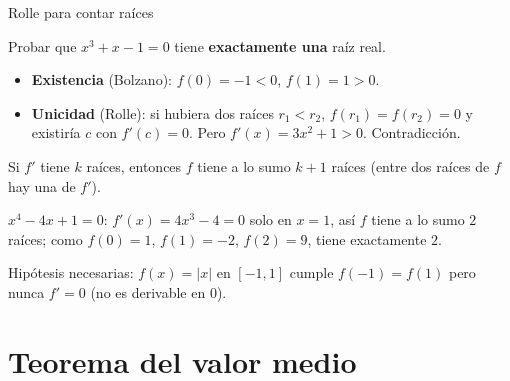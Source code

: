 \documentclass[10pt,aspectratio=169]{beamer}
\begin{document}
\begin{frame}{Rolle para contar raíces}
  \begin{ejemplo}[2]
    Probar que $x^3+x-1=0$ tiene \textbf{exactamente una} raíz real.
    \begin{itemize}
      \item \textbf{Existencia} (Bolzano): $f(0)=-1<0$, $f(1)=1>0$.
      \item \textbf{Unicidad} (Rolle): si hubiera dos raíces $r_1<r_2$, $f(r_1)=f(r_2)=0$ y existiría $c$ con $f'(c)=0$. Pero
        $f'(x)=3x^2+1>0$. Contradicción.
    \end{itemize}
  \end{ejemplo}
  \begin{proposicion}[consecuencia]
    Si $f'$ tiene $k$ raíces, entonces $f$ tiene a lo sumo $k+1$ raíces (entre dos raíces de $f$ hay una de $f'$).
  \end{proposicion}
  \begin{ejemplo}[3]
    $x^4-4x+1=0$: $f'(x)=4x^3-4=0$ solo en $x=1$, así $f$ tiene a lo sumo $2$ raíces; como $f(0)=1$, $f(1)=-2$, $f(2)=9$, tiene exactamente $2$.
  \end{ejemplo}
  \begin{observacion}
    Hipótesis necesarias: $f(x)=|x|$ en $[-1,1]$ cumple $f(-1)=f(1)$ pero nunca $f'=0$ (no es derivable en $0$).
  \end{observacion}
\end{frame}

\section{Teorema del valor medio}
\end{document}
